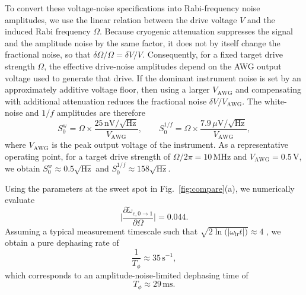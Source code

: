 To convert these voltage-noise specifications into Rabi-frequency noise amplitudes, we use the linear relation between the drive voltage $V$ and the induced Rabi frequency $\Omega$. Because cryogenic attenuation suppresses the signal and the amplitude noise by the same factor, it does not by itself change the fractional noise, so that \(\delta \Omega / \Omega = \delta V / V\). Consequently, for a fixed target drive strength \(\Omega\), the effective drive-noise amplitudes depend on the AWG output voltage used to generate that drive. If the dominant instrument noise is set by an approximately additive voltage floor, then using a larger \(V_{\mathrm{AWG}}\) and compensating with additional attenuation reduces the fractional noise \(\delta V/V_{\mathrm{AWG}}\). The white-noise and \(1/f\) amplitudes are therefore
\begin{equation}
    S_0^\mathrm{w} = \Omega \times \frac{25\,\mathrm{nV}/\sqrt{\mathrm{Hz}}}{V_{\mathrm{AWG}}},
    \qquad
    S_0^{1/f} = \Omega \times \frac{7.9\,\mu\mathrm{V}/\sqrt{\mathrm{Hz}}}{V_{\mathrm{AWG}}},
\end{equation}
where \(V_{\mathrm{AWG}}\) is the peak output voltage of the instrument. As a representative operating point, for a target drive strength of \(\Omega/2\pi = 10\,\mathrm{MHz}\) and \(V_{\mathrm{AWG}}=0.5\,\mathrm{V}\), we obtain \(S_0^\mathrm{w} \approx 0.5\sqrt{\mathrm{Hz}}\) and \(S_0^{1/f} \approx 158\sqrt{\mathrm{Hz}}\).

Using the parameters at the sweet spot in Fig.~\ref{fig:compare}(a), we numerically evaluate
\begin{equation}
    \bigg|\frac{\partial \widetilde{\omega}_{c,0\rightarrow 1}}{\partial \Omega}\bigg| = 0.044.
\end{equation}
Assuming a typical measurement timescale such that $\sqrt{2\ln\!\bigl(|\omega_\text{ir} t|\bigr)} \approx 4$ \cite{PhysRevX.7.031037factor4}, we obtain a pure dephasing rate of
\begin{equation}
    \frac{1}{T_\phi} \approx 35\,\mathrm{s}^{-1},
\end{equation}
which corresponds to an amplitude-noise-limited dephasing time of
\begin{equation}
    T_\phi \approx 29\,\mathrm{ms}.
\end{equation}